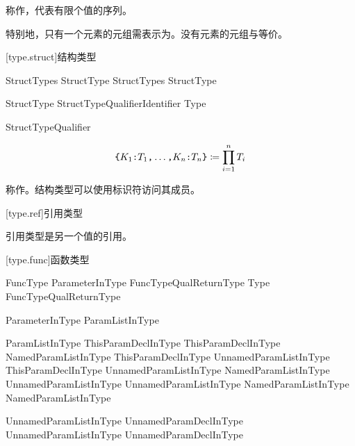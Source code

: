 \pnum
{}称作，代表有限个值的序列。

\pnum
特别地，只有一个元素的元组需表示为。没有元素的元组与等价。

[type.struct]{结构类型}

\begin{bnf}{StructTypes}
    StructType \br
    StructTypes \terminal{,} StructType
\end{bnf}

\begin{bnf}{StructType}
    StructTypeQualifier\bnfs Identifier \terminal{:} Type
\end{bnf}

\begin{bnf}{StructTypeQualifier}
\end{bnf}

$$ \texttt{\{} K_1\texttt{:}T_1\texttt{,} \ldots\texttt{,} K_n\texttt{:}T_n \texttt{\}} \coloneqq \prod^n_{i=1} T_i $$

\pnum
{}称作。结构类型可以使用标识符访问其成员。

[type.ref]{引用类型}

\pnum
引用类型是另一个值的引用。

[type.func]{函数类型}

\begin{bnf}{FuncType}
    ParameterInType FuncTypeQual\bnfs ReturnType \br
    Type FuncTypeQual\bnfs ReturnType
\end{bnf}

\begin{bnf}{ParameterInType}
    \terminal{(} ParamListInType\bnfq \terminal{)}
\end{bnf}

\begin{bnf}{ParamListInType}
    ThisParamDeclInType \br
    ThisParamDeclInType \terminal{,} NamedParamListInType \br
    ThisParamDeclInType \terminal{,} UnnamedParamListInType \br
    ThisParamDeclInType \terminal{,} UnnamedParamListInType \terminal{,} NamedParamListInType \br
    UnnamedParamListInType \br
    UnnamedParamListInType \terminal{,} NamedParamListInType \br
    NamedParamListInType
\end{bnf}

\begin{bnf}{UnnamedParamListInType}
    UnnamedParamDeclInType \br
    UnnamedParamListInType \terminal{,} UnnamedParamDeclInType
\end{bnf}

